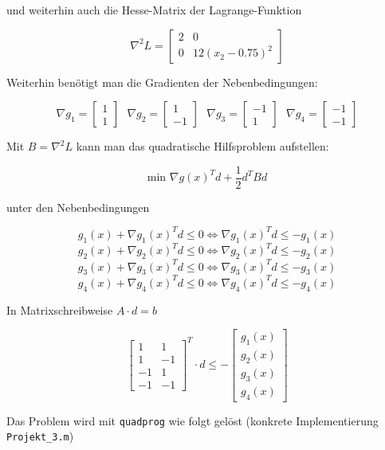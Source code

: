 \documentclass[a4paper, 12pt]{report}
\begin{document}
und weiterhin auch die Hesse-Matrix der Lagrange-Funktion

$$\nabla^2L = \begin{bmatrix}2 & 0\\0 & 12(x_2 - 0.75)^2\end{bmatrix}$$

Weiterhin benötigt man die Gradienten der Nebenbedingungen:

$$\nabla g_1 = \begin{bmatrix}1\\1\end{bmatrix} \text{  } \nabla g_2 = \begin{bmatrix}1\\-1\end{bmatrix} \text{  } \nabla g_3 = \begin{bmatrix}-1\\1\end{bmatrix} \text{  } \nabla g_4 = \begin{bmatrix}-1\\-1\end{bmatrix}$$

Mit $B = \nabla^2L$ kann man das quadratische Hilfsproblem aufstellen:

$$\text{min }\nabla g(x)^Td + \frac{1}{2}d^TBd$$

unter den Nebenbedingungen

$$g_1(x) + \nabla g_1(x)^Td \leq 0 \Leftrightarrow \nabla g_1(x)^Td \leq -g_1(x)$$
$$g_2(x) + \nabla g_2(x)^Td \leq 0 \Leftrightarrow \nabla g_2(x)^Td \leq -g_2(x)$$
$$g_3(x) + \nabla g_3(x)^Td \leq 0 \Leftrightarrow \nabla g_3(x)^Td \leq -g_3(x)$$
$$g_4(x) + \nabla g_4(x)^Td \leq 0 \Leftrightarrow \nabla g_4(x)^Td \leq -g_4(x)$$

In Matrixschreibweise $A\cdot d = b$

$$\begin{bmatrix}1 & 1\\1 & -1\\-1 & 1\\-1 & -1\end{bmatrix}^T\cdot d \leq -\begin{bmatrix}g_1(x)\\g_2(x)\\g_3(x)\\g_4(x)\end{bmatrix}$$

\newpage

Das Problem wird mit \lstinline[basicstyle=\ttfamily\color{black}]|quadprog| wie folgt gelöst
(konkrete Implementierung \lstinline[basicstyle=\ttfamily\color{black}]|Projekt_3.m|)
\end{document}
